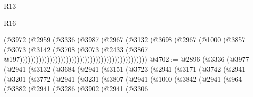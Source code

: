 \begin{lexlean}{R13}
\begin{lexlean}{R16}
\begin{coremodule}
{{{{{{{{{{{{{{{{{{{{{{{{{{{{{{{{{{{{{{{{{{{{{{{{{{{{{{{{{{{{{{{{{{{{{{{{{{{{{{{{{{{{{{{{{{{{{{{{{{{{{{{{{{{{{{{{{                                                                  (@3972
                                                                    (@2959
                                                                      (@3336
                                                                        (@3987
                                                                          (@2967
                                                                            (@3132
                                                                              (@3698
                                                                                (@2967
                                                                                  (@1000
                                                                                    (@3857
                                                                                      (@3073
                                                                                        (@3142
                                                                                          (@3708
                                                                                            (@3073
                                                                                              (@2433
                                                                                                (@3867
                                                                                                  @197)))))))))))))))))))))))))))))))))))))))))))))))
@4702 := @2896
    (@3336
      (@3977
        (@2941
          (@3132
            (@3684
              (@2941
                (@3151
                  (@3723
                    (@2941
                      (@3171
                        (@3742
                          (@2941
                            (@3201
                              (@3772
                                (@2941
                                  (@3231
                                    (@3807
                                      (@2941
                                        (@1000
                                          (@3842
                                            (@2941
                                              (@964
                                                (@3882
                                                  (@2941
                                                    (@3286
                                                      (@3902
                                                        (@2941
                                                          (@3306
}}}}}}}}}}}}}}}}}}}}}}}}}}}}}}}}}}}}}}}}}}}}}}}}}}}}}}}}}}}}}}}}}}}}}}}}}}}}}}}}}}}}}}}}}}}}}}}}}}}}}}}}}}}}}}}}}
\end{coremodule}
\end{lexlean}
\end{lexlean}
